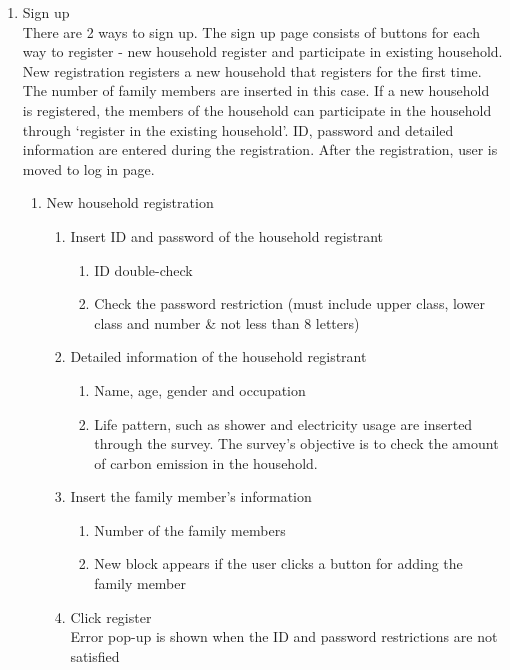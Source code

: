 \documentclass[11pt, conference]{IEEEtran}
\begin{document}
\begin{enumerate}[label=\arabic*]
    \item {\large{Sign up}}\\
    There are 2 ways to sign up. The sign up page consists of buttons for each way to register - new household register and participate in existing household. New registration registers a new household that registers for the first time. The number of family members are inserted in this case. If a new household is registered, the members of the household can participate in the household through ‘register in the existing household’. ID, password and detailed information are entered during the registration. After the registration, user is moved to log in page.
    \begin{enumerate}[label=\alph*]
        \item New household registration
        \begin{enumerate}
            \item Insert ID and password of the household registrant
            \begin{enumerate}[label=\arabic*]
                \item ID double-check
                \item Check the password restriction (must include upper class, lower class and number \& not less than 8 letters)
            \end{enumerate}
            \item Detailed information of the household registrant
            \begin{enumerate}[label=\arabic*]
                \item Name, age, gender and occupation
                \item Life pattern, such as shower and electricity usage are inserted through the survey. The survey’s objective is to check the amount of carbon emission in the household.
            \end{enumerate}
            \item Insert the family member’s information
            \begin{enumerate}[label=\arabic*]
                \item Number of the family members
                \item New block appears if the user clicks a button for adding the family member
            \end{enumerate}
            \item Click register \\                Error pop-up is shown when the ID and password restrictions are not satisfied

\end{enumerate}
\end{enumerate}
\end{enumerate}
\end{document}
